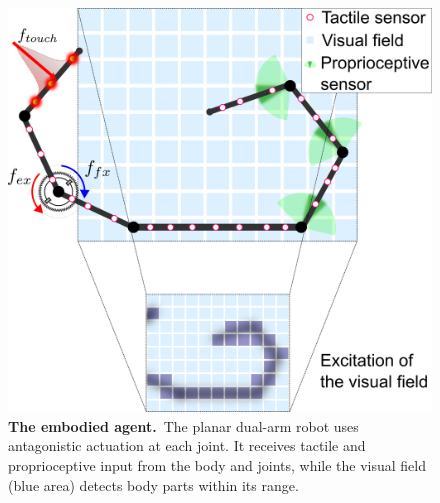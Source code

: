 \documentclass[letterpaper, 10 pt, conference]{ieeeconf}  %
\begin{document}
\begin{figure}[!t]
	\begin{center}
		\hspace*{\fill}
		\includegraphics[width=0.99\columnwidth]{extended_planar_dual_arm_with_vision_v2.png}
		\hspace*{\fill}
	\end{center}
	\caption{\label{fig:extended_dual_arm_robot} \textbf{The embodied agent.}~The planar dual-arm robot uses antagonistic actuation at each joint. It receives tactile and proprioceptive input from the body and joints, while the visual field (blue area) detects body parts within its range.}
    \vspace{-20pt}
\end{figure}
\end{document}
